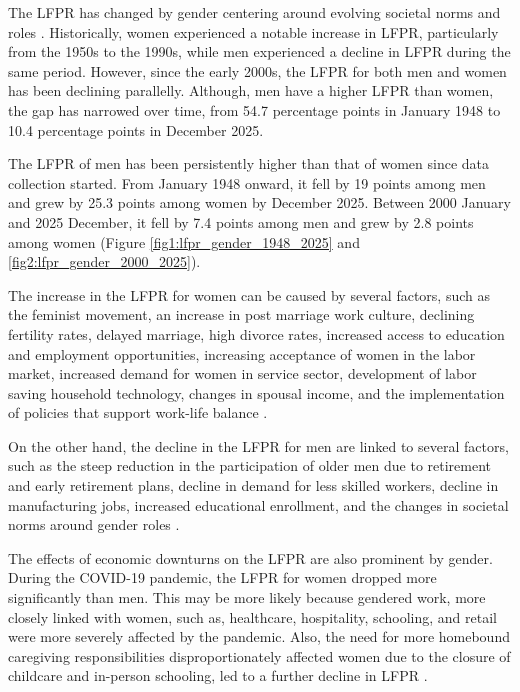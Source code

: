 \documentclass[letterpaper]{scrartcl}
\begin{document}
\quad The LFPR has changed by gender centering around evolving societal norms and roles \parencite{Fu2025LFPR}. Historically, women experienced a notable increase in LFPR, particularly from the 1950s to the 1990s, while men experienced a decline in LFPR during the same period. However, since the early 2000s, the LFPR for both men and women has been declining parallelly. Although, men have a higher LFPR than women, the gap has narrowed over time, from 54.7 percentage points in January 1948 to 10.4 percentage points in December 2025.

The LFPR of men has been persistently higher than that of women since data collection started. From January 1948 onward, it fell by 19 points among men and grew by 25.3 points among women by December 2025. Between 2000 January and 2025 December, it fell by 7.4 points among men and grew by 2.8 points among women (Figure \ref{fig1:lfpr_gender_1948_2025} and \ref{fig2:lfpr_gender_2000_2025}).

The increase in the LFPR for women can be caused by several factors, such as the feminist movement, an increase in post marriage work culture, declining fertility rates, delayed marriage, high divorce rates, increased access to education and employment opportunities, increasing acceptance of women in the labor market, increased demand for women in service sector, development of labor saving household technology, changes in spousal income, and the implementation of policies that support work-life balance \parencite{killingsworth1986female,greenwood2005engines, juhn2006changes,salamaliki2014smooth}.

On the other hand, the decline in the LFPR for men are linked to several factors, such as the steep reduction in the participation of older men due to retirement and early retirement plans, decline in demand for less skilled workers, decline in manufacturing jobs, increased educational enrollment, and the changes in societal norms around gender roles \parencite{murphy1997unemployment,juhn2006changes,salamaliki2014smooth}.

The effects of economic downturns on the LFPR are also prominent by gender. During the COVID-19 pandemic, the LFPR for women dropped more significantly than men. This may be more likely because gendered work, more closely linked with women, such as, healthcare, hospitality, schooling, and retail were more severely affected by the pandemic. Also, the need for more homebound caregiving responsibilities disproportionately affected women due to the closure of childcare and in-person schooling, led to a further decline in LFPR \parencite{albanesi2021gendered, AaronsonAlba2021SchoolClosures}.
\end{document}
